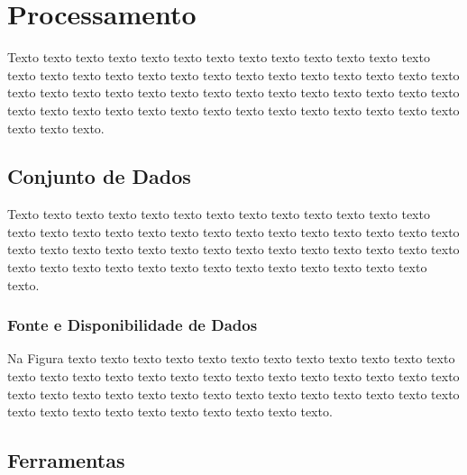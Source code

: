 \chapter{Processamento}
\label{cap:processamento}

Texto texto texto texto texto texto texto texto texto texto texto texto texto
texto texto texto texto texto texto texto texto texto texto texto texto texto
texto texto texto texto texto texto texto texto texto texto texto texto texto
texto texto texto texto texto texto texto texto texto texto texto texto texto
texto texto texto texto texto texto.

\section{Conjunto de Dados}
\label{sec:fundamentos}

Texto texto texto texto texto texto texto texto texto texto texto texto texto
texto texto texto texto texto texto texto texto texto texto texto texto texto
texto texto texto texto texto texto texto texto texto texto texto texto texto
texto texto texto texto texto texto texto texto texto texto texto texto texto
texto texto texto.

\subsection{Fonte e Disponibilidade de
Dados}
\label{sec:acidos_nucleicos}

Na Figura texto texto texto texto texto texto texto texto
texto texto texto texto texto texto texto texto texto texto texto texto texto
texto texto texto texto texto texto texto texto texto texto texto texto texto
texto texto texto texto texto texto texto texto texto texto texto texto texto
texto texto texto.



\section{Ferramentas}
\label{sec:fundamentos}

